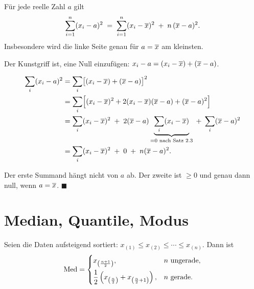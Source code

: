 \begin{merksatz}
Für jede reelle Zahl $a$ gilt
\[ \sum_{i=1}^n (x_i - a)^2 \;=\; \sum_{i=1}^n (x_i - \overline{x})^2 \;+\; n\,(\overline{x} - a)^2 . \]
Insbesondere wird die linke Seite genau für $a = \overline{x}$ am kleinsten.

Der Kunstgriff ist, eine Null einzufügen: $x_i - a = (x_i - \overline{x}) + (\overline{x} - a)$.

\begin{align*}
\sum_i (x_i-a)^2 &= \sum_i \bigl[(x_i-\overline{x}) + (\overline{x}-a)\bigr]^2\\
&= \sum_i \Bigl[(x_i-\overline{x})^2 + 2(x_i-\overline{x})(\overline{x}-a) + (\overline{x}-a)^2\Bigr]\\
&= \sum_i (x_i-\overline{x})^2 \;+\; 2(\overline{x}-a)\underbrace{\sum_i (x_i-\overline{x})}_{= 0 \text{ nach Satz 2.3}} \;+\; \sum_i (\overline{x}-a)^2\\
&= \sum_i (x_i-\overline{x})^2 \;+\; 0 \;+\; n(\overline{x}-a)^2 .
\end{align*}

Der erste Summand hängt nicht von $a$ ab. Der zweite ist $\ge 0$ und genau dann null, wenn $a = \overline{x}$. $\blacksquare$

\begin{center}
\begin{minipage}{0.88\textwidth}
\end{minipage}
\end{center}
\end{merksatz}

\section{Median, Quantile, Modus}

\begin{definition}
Seien die Daten aufsteigend sortiert: $x_{(1)} \le x_{(2)} \le \cdots \le x_{(n)}$. Dann ist
\[ \operatorname{Med} = \begin{cases}
x_{\left(\frac{n+1}{2}\right)}, & n \text{ ungerade},\\[6pt]
\dfrac{1}{2}\left(x_{\left(\frac{n}{2}\right)} + x_{\left(\frac{n}{2}+1\right)}\right), & n \text{ gerade}.
\end{cases} \]
\end{definition}

